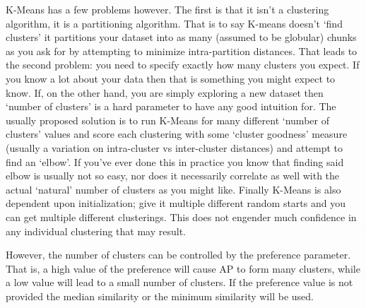 K-Means has a few problems however. The first is that it isn’t a clustering algorithm, it is a partitioning algorithm. That is to say K-means doesn’t ‘find clusters’ it partitions your dataset into as many (assumed to be globular) chunks as you ask for by attempting to minimize intra-partition distances. That leads to the second problem: you need to specify exactly how many clusters you expect. If you know a lot about your data then that is something you might expect to know. If, on the other hand, you are simply exploring a new dataset then ‘number of clusters’ is a hard parameter to have any good intuition for. The usually proposed solution is to run K-Means for many different ‘number of clusters’ values and score each clustering with some ‘cluster goodness’ measure (usually a variation on intra-cluster vs inter-cluster distances) and attempt to find an ‘elbow’. If you’ve ever done this in practice you know that finding said elbow is usually not so easy, nor does it necessarily correlate as well with the actual ‘natural’ number of clusters as you might like. Finally K-Means is also dependent upon initialization; give it multiple different random starts and you can get multiple different clusterings. This does not engender much confidence in any individual clustering that may result.


However, the number of
clusters can be controlled by the preference parameter. That is, a high value
of the preference will cause AP to form many clusters, while a low value will
lead to a small number of clusters. If the preference value is not provided
the median similarity or the minimum similarity will be used.





